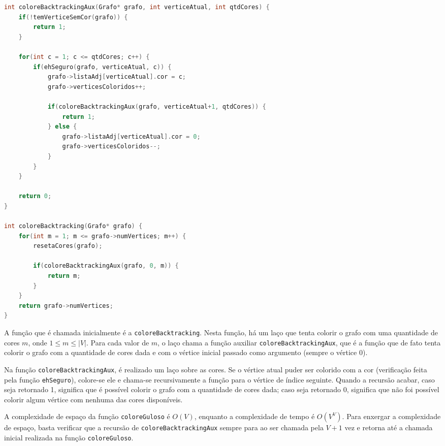 \documentclass{article}
\begin{document}
\vspace{0.5em}
\begin{adjustwidth}{2.5em}{}
\begin{lstlisting}[language=C]
int coloreBacktrackingAux(Grafo* grafo, int verticeAtual, int qtdCores) {
	if(!temVerticeSemCor(grafo)) {
		return 1;
	}
	
	for(int c = 1; c <= qtdCores; c++) {
		if(ehSeguro(grafo, verticeAtual, c)) {
			grafo->listaAdj[verticeAtual].cor = c;
			grafo->verticesColoridos++;
			
			if(coloreBacktrackingAux(grafo, verticeAtual+1, qtdCores)) {
				return 1;
			} else {
				grafo->listaAdj[verticeAtual].cor = 0;
				grafo->verticesColoridos--;
			}
		}
	}
	
	return 0;
}

int coloreBacktracking(Grafo* grafo) {
	for(int m = 1; m <= grafo->numVertices; m++) {
		resetaCores(grafo);
		
		if(coloreBacktrackingAux(grafo, 0, m)) {
			return m;
		}
	}
	return grafo->numVertices;
}
\end{lstlisting}
\end{adjustwidth}
\vspace{0.5em}

A função que é chamada inicialmente é a \texttt{coloreBacktracking}. Nesta função, há um laço que tenta colorir o grafo com uma quantidade de cores $m$, onde $1\le m\le|V|$. Para cada valor de $m$, o laço chama a função auxiliar \texttt{coloreBacktrackingAux}, que é a função que de fato tenta colorir o grafo com a quantidade de cores dada e com o vértice inicial passado como argumento (sempre o vértice 0).

Na função \texttt{coloreBacktrackingAux}, é realizado um laço sobre as cores. Se o vértice atual puder ser colorido com a cor (verificação feita pela função \texttt{ehSeguro}), colore-se ele e chama-se recursivamente a função para o vértice de índice seguinte. Quando a recursão acabar, caso seja retornado 1, significa que é possível colorir o grafo com a quantidade de cores dada; caso seja retornado 0, significa que não foi possível colorir algum vértice com nenhuma das cores disponíveis.

A complexidade de espaço da função \texttt{coloreGuloso} é $O(V)$, enquanto a complexidade de tempo é $O(V^V)$. Para enxergar a complexidade de espaço, basta verificar que a recursão de \texttt{coloreBacktrackingAux} sempre para ao ser chamada pela $V+1$ vez e retorna até a chamada inicial realizada na função \texttt{coloreGuloso}.
\end{document}
